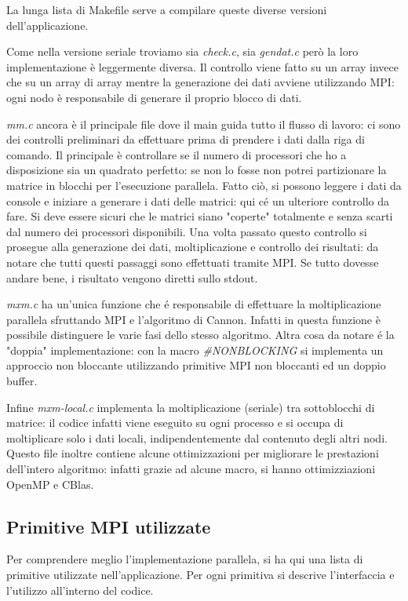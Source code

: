 La lunga lista di Makefile serve a compilare queste diverse versioni dell'applicazione.

Come nella versione seriale troviamo sia \textit{check.c}, sia \textit{gendat.c} per\`{o} la loro implementazione \`{e} leggermente diversa. Il controllo viene fatto su un array invece che su un array di array mentre la generazione dei dati avviene utilizzando MPI: ogni nodo \`{e} responsabile di generare il proprio blocco di dati.

\textit{mm.c} ancora \`{e} il principale file dove il main guida tutto il flusso di lavoro: ci sono dei controlli preliminari da effettuare prima di prendere i dati dalla riga di comando. Il principale \`{e} controllare se il numero di processori che ho a disposizione sia un quadrato perfetto: se non lo fosse non potrei partizionare la matrice in blocchi per l'esecuzione parallela. Fatto ci\`{o}, si possono leggere i dati da console e iniziare a generare i dati delle matrici: qui c\'{e} un ulteriore controllo da fare. Si deve essere sicuri che le matrici siano "coperte" totalmente e senza scarti dal numero dei processori disponibili. Una volta passato questo controllo si prosegue alla generazione dei dati, moltiplicazione e controllo dei risultati: da notare che tutti questi passaggi sono effettuati tramite MPI. Se tutto dovesse andare bene, i risultato vengono diretti sullo stdout.

\textit{mxm.c} ha un'unica funzione che \'{e} responsabile di effettuare la moltiplicazione parallela sfruttando MPI e l'algoritmo di Cannon. Infatti in questa funzione \`{e} possibile distinguere le varie fasi dello stesso algoritmo.
Altra cosa da notare \'{e} la "doppia" implementazione: con la macro \textit{\#NONBLOCKING} si implementa un approccio non bloccante utilizzando primitive MPI non bloccanti ed un doppio buffer.

Infine \textit{mxm-local.c} implementa la moltiplicazione (seriale) tra sottoblocchi di matrice: il codice infatti viene eseguito su ogni processo e si occupa di moltiplicare solo i dati locali, indipendentemente dal contenuto degli altri nodi. Questo file inoltre contiene alcune ottimizzazioni per migliorare le prestazioni dell'intero algoritmo: infatti grazie ad alcune macro, si hanno ottimizziazioni OpenMP e CBlas.

\subsection{Primitive MPI utilizzate}
Per comprendere meglio l'implementazione parallela, si ha qui una lista di primitive utilizzate nell'applicazione. Per ogni primitiva si descrive l'interfaccia e l'utilizzo all'interno del codice.

